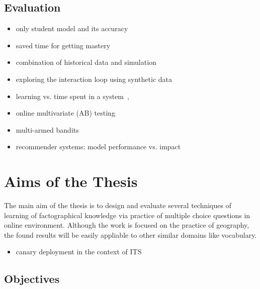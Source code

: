 \documentclass[table,color]{fithesis3/fithesis3}
\begin{document}
\section{Evaluation}
\label{section:evaluation}

\begin{itemize}
	\item only student model and its accuracy~\cite{pelanek2014brief}
	\item saved time for getting mastery~\cite{yudelson2015small}
	\item combination of historical data and simulation~\cite{gonzalez2015your}
	\item exploring the interaction loop using synthetic data~\cite{niznan2015exploring}
	\item learning vs. time spent in a system~\cite{lomas2013optimizing, monterrat2015player},
	\item online multivariate (AB) testing~\cite{lomas2013optimizing,liu2014towards,stamper2012rise}
	\item multi-armed bandits~\cite{liu2014trading,lopes2015multi}
	\item recommender systems: model performance vs. impact~\cite{cremonesi2010performance}
\end{itemize}

\chapter{Aims of the Thesis}

The main aim of the thesis is to design and evaluate several techniques of
learning of factographical knowledge via practice of multiple choice questions in
online environment. Although the work is focused on the practice of geography,
the found results will be easily appliable to other similar domains like
vocabulary.

\begin{itemize}
	\item canary deployment in the context of ITS
\end{itemize}

\section{Objectives}
\end{document}
